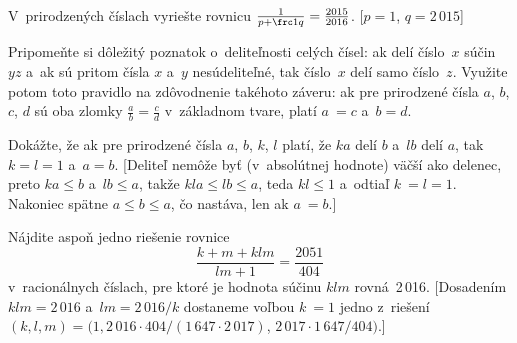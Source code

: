 {
V~prirodzených číslach vyriešte rovnicu $\frac 1{p+\frc
1q} = \frac {2015} {2016}$. [$p = 1$, $ q = 2\,015$]

Pripomeňte si dôležitý poznatok o~deliteľnosti celých čísel: ak delí
číslo~$x$ súčin~$yz$ a~ak sú pritom čísla $x$ a~$y$ nesúdeliteľné, tak
číslo~$x$ delí samo číslo~$z$. Využite potom toto pravidlo na zdôvodnenie
takéhoto záveru: ak pre prirodzené čísla $a$, $b$, $c$, $d$ sú
oba zlomky $\frac ab = \frac cd$ v~základnom tvare, platí $a~= c$ a~$b = d$.

Dokážte, že ak pre prirodzené čísla $a$, $b$, $k$, $l$ platí, že $ka$ delí
$b$ a~$lb$ delí $a$, tak $k= l = 1$ a~$a=b$. [Deliteľ nemôže byť
(v~absolútnej hodnote) väčší ako delenec, preto $ka \le b$ a~$lb \le a$, takže
$kla \le lb \le a$, teda $kl \le 1$ a~odtiaľ $k~= l = 1$. Nakoniec spätne
$a\le b \le a$, čo nastáva, len ak $a~= b$.]

\D
Nájdite aspoň jedno riešenie rovnice
$$\frac {k+m+klm} {lm+1} = \frac {2051} {404}$$ v~racionálnych číslach, pre ktoré
je hodnota súčinu $klm$ rovná~2\,016. [Dosadením
$klm = 2\,016$ a~$lm = 2\,016/k$ dostaneme voľbou $k~= 1$ jedno z~riešení
$(k,l,m) = (1, {2\,016 \cdot 404}/(1\,647 \cdot 2\,017)$, $ 2\,017 \cdot 1\,647/404)$.]
}

